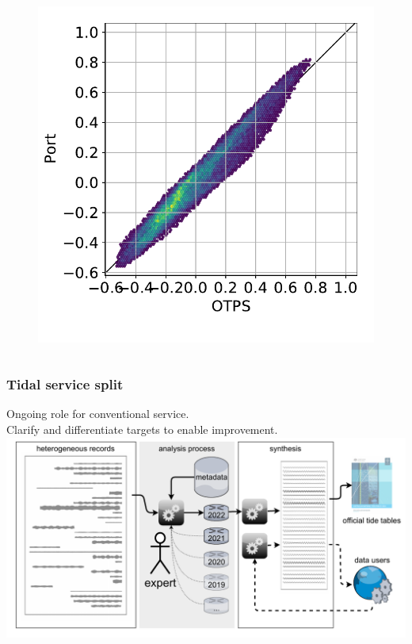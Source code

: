 \begin{frame}
\begin{columns}
\begin{column}{0.3\textwidth}
\begin{figure}
        \\
        \includegraphics[height=0.25\textheight]{figures/plots/compareTides_61561_2020_105.pdf}
      \end{figure}
    \end{column}
\end{columns}
\end{frame}
\begin{frame}
\frametitle{Tidal service split}
Ongoing role for conventional service.\\
Clarify and differentiate targets to enable improvement. 
\vfill{}
    \includegraphics[height=0.6\textheight]{figures/diagrams/tideSchematic.pdf}
\end{frame}